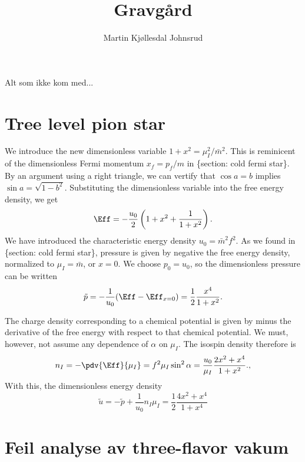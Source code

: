 \documentclass{book}
\title{\huge{Gravgård}}
\author{
    \large{Martin Kjøllesdal Johnsrud }
    }
\begin{document}
\maketitle
\setlength{\parindent}{0em}
\setlength{\parskip}{0.8em}


Alt som ikke kom med...

\section{Tree level pion star}


We introduce the new dimensionless variable $1 + x^2 = \mu_I^2 / \bar m^2$.
This is reminicent of the dimensionless Fermi momentum $x_f = p_f / m$ in \{section: cold fermi star\}.
By an argument using a right triangle, we can vertify that $\cos a = b$ implies $\sin a = \sqrt{1 - b^2}$.
Substituting the dimensionless variable into the free energy density, we get
%
\begin{equation}
    \Eff = - \frac{u_0}{2}\left(1 + x^2 +\frac{1}{1 + x^2}\right).
\end{equation}
%
We have introduced the characteristic energy density $u_0 = \bar m^2 f^2$.
As we found in \{section: cold fermi star\}, pressure is given by negative the free energy density, normalized to $\mu_I = \bar m$, or $x = 0$.
We choose $p_0 = u_0$, so the dimensionless pressure can be written
%
\begin{equation}
    \tilde p = -\frac{1}{u_0}(\Eff - \Eff_{x = 0}) 
    = \frac{1}{2} \frac{x^4}{1 + x^2}.
\end{equation}
%

The charge density corresponding to a chemical potential is given by minus the derivative of the free energy with respect to that chemical potential.
We must, however, not assume any dependence of $\alpha$ on $\mu_I$.
The isospin density therefore is
%
\begin{equation}
    n_I = -\pdv{\Eff}{\mu_I} = f^2 \mu_I \sin^2 \alpha
    = \frac{u_0}{\mu_I} \frac{2x^2 + x^4}{1 + x^2}.
    ,
\end{equation}
%
With this, the dimensionless energy density
%
\begin{equation}
    \tilde u = -\tilde p + \frac{1}{u_0} n_I \mu_I
    = \frac{1}{2} \frac{4x^2 + x^4}{1 + x^4}
\end{equation}
% 


\section{Feil analyse av three-flavor vakum}
\end{document}
